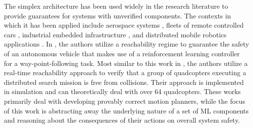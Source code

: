 \documentclass[manuscript,screen,review]{acmart}
\begin{document}
The simplex architecture has been used widely in the research literature to provide guarantees for systems with unverified components. The contexts in which it has been applied include aerospace systems \cite{SetoCaseStudy2000}, fleets of remote controlled cars \cite{Crenshaw2007}, industrial embedded infrastructure \cite{Bak2009Simplex,Yang2017}, and distributed mobile robotics applications \cite{Desai2018,Tran2020}. In \cite{Lin2020}, the authors utilize a reachability regime to guarantee the safety of an autonomous vehicle that makes use of a reinforcement learning controller for a way-point-following task. Most similar to this work in \cite{Tran2020}, the authors utilize a real-time reachability approach to verify that a group of quadcopters executing a distributed search mission is free from collisions. Their approach is implemented in simulation and can theoretically deal with over 64 quadcopters. These works primarily deal with developing provably correct motion planners, while the focus of this work is abstracting away the underlying nature of a set of ML components and reasoning about the consequences of their actions on overall system safety.



\end{document}
